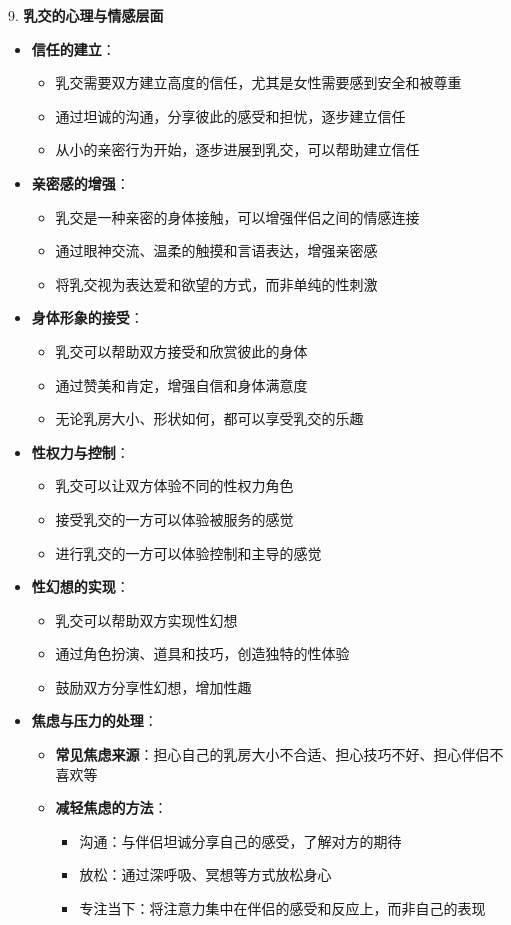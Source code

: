 \documentclass[12pt,UTF8]{ctexbook}
\begin{document}
9. \textbf{乳交的心理与情感层面}
\begin{itemize}
	\item \textbf{信任的建立}：
	\begin{itemize}
		\item 乳交需要双方建立高度的信任，尤其是女性需要感到安全和被尊重
		\item 通过坦诚的沟通，分享彼此的感受和担忧，逐步建立信任
		\item 从小的亲密行为开始，逐步进展到乳交，可以帮助建立信任
	\end{itemize}
	\item \textbf{亲密感的增强}：
	\begin{itemize}
		\item 乳交是一种亲密的身体接触，可以增强伴侣之间的情感连接
		\item 通过眼神交流、温柔的触摸和言语表达，增强亲密感
		\item 将乳交视为表达爱和欲望的方式，而非单纯的性刺激
	\end{itemize}
	\item \textbf{身体形象的接受}：
	\begin{itemize}
		\item 乳交可以帮助双方接受和欣赏彼此的身体
		\item 通过赞美和肯定，增强自信和身体满意度
		\item 无论乳房大小、形状如何，都可以享受乳交的乐趣
	\end{itemize}
	\item \textbf{性权力与控制}：
	\begin{itemize}
		\item 乳交可以让双方体验不同的性权力角色
		\item 接受乳交的一方可以体验被服务的感觉
		\item 进行乳交的一方可以体验控制和主导的感觉
	\end{itemize}
	\item \textbf{性幻想的实现}：
	\begin{itemize}
		\item 乳交可以帮助双方实现性幻想
		\item 通过角色扮演、道具和技巧，创造独特的性体验
		\item 鼓励双方分享性幻想，增加性趣
	\end{itemize}
	\item \textbf{焦虑与压力的处理}：
	\begin{itemize}
		\item \textbf{常见焦虑来源}：担心自己的乳房大小不合适、担心技巧不好、担心伴侣不喜欢等
		\item \textbf{减轻焦虑的方法}：
		\begin{itemize}
			\item 沟通：与伴侣坦诚分享自己的感受，了解对方的期待
			\item 放松：通过深呼吸、冥想等方式放松身心
			\item 专注当下：将注意力集中在伴侣的感受和反应上，而非自己的表现
		\end{itemize}
	\end{itemize}
\end{itemize}
\end{document}
